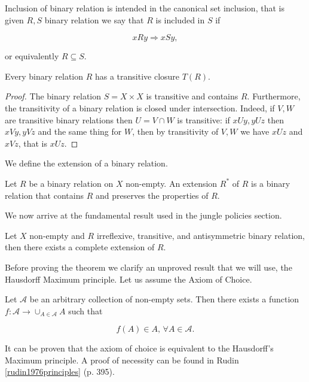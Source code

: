 Inclusion of binary relation is intended in the canonical set inclusion, that is given $R,S$ binary relation we say that $R$ is included in $S$ if

\[xRy \Rightarrow xSy,\]

or equivalently $R\subseteq S$.

\begin{proposition}
    Every binary relation $R$ has a transitive closure $T(R)$.

    \begin{proof}
        The binary relation $S=X\times X$ is transitive and contains $R$. Furthermore, the transitivity of a binary relation is closed under intersection. Indeed, if $V,W$ are transitive binary relations then $U=V\cap W$ is transitive: if $xUy,yUz$ then $xVy,yVz$ and the same thing for $W$, then by transitivity of $V,W$ we have $xUz$ and $xVz$, that is $xUz$. 
    \end{proof}
\end{proposition}

We define the extension of a binary relation.

\begin{definition}
    Let $R$ be a binary relation on $X$ non-empty. An extension $R^{\ast}$ of $R$ is a binary relation that contains $R$ and preserves the properties of $R$.  
\end{definition}

We now arrive at the fundamental result used in the jungle policies section.

\begin{theorem*}
    Let $X$ non-empty and $R$ irreflexive, transitive, and antisymmetric binary relation, then there exists a complete extension of $R$.
\end{theorem*}

Before proving the theorem we clarify an unproved result that we will use, the Hausdorff Maximum principle. Let us assume the Axiom of Choice.

\begin{axiom}
    Let $\mathcal{A}$ be an arbitrary collection of non-empty sets. Then there exists a function $f:\mathcal{A} \rightarrow \cup_{A\in\mathcal{A}}A$ such that

    \[f(A)\in A,\,\forall A\in\mathcal{A}.\]
\end{axiom}

It can be proven that the axiom of choice is equivalent to the Hausdorff's Maximum principle. A proof of necessity can be found in Rudin \ref{rudin1976principles} (p. 395).

